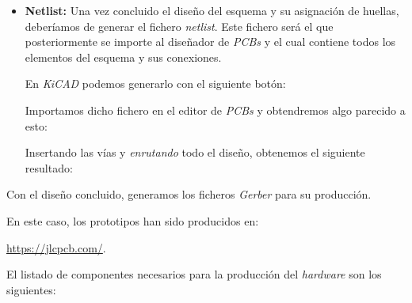 \begin{itemize}
\item
\textbf{Netlist:} Una vez concluido el diseño del esquema y su asignación de huellas, deberíamos de generar el fichero \emph{netlist}. Este fichero será el que posteriormente se importe al diseñador de \emph{PCBs} y el cual contiene todos los elementos del esquema y sus conexiones.

En \emph{KiCAD} podemos generarlo con el siguiente botón:


Importamos dicho fichero en el editor de \emph{PCBs} y obtendremos algo parecido a esto:


Insertando las vías y \emph{enrutando} todo el diseño, obtenemos el siguiente resultado:


\end{itemize}

Con el diseño concluido, generamos los ficheros \emph{Gerber} para su producción.

En este caso, los prototipos han sido producidos en:

\url{https://jlcpcb.com/}.

El listado de componentes necesarios para la producción del \emph{hardware} son los siguientes:


